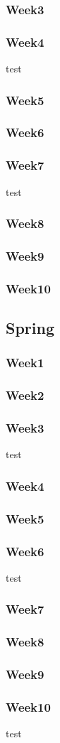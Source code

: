 \subsubsection*{Week3}
\subsubsection*{Week4}
test
\subsubsection*{Week5}
\subsubsection*{Week6}
\subsubsection*{Week7}
test
\subsubsection*{Week8}
\subsubsection*{Week9}
\subsubsection*{Week10}

\subsection*{Spring}
\subsubsection*{Week1}
\subsubsection*{Week2}
\subsubsection*{Week3}
test
\subsubsection*{Week4}
\subsubsection*{Week5}
\subsubsection*{Week6}
test
\subsubsection*{Week7}
\subsubsection*{Week8}
\subsubsection*{Week9}
\subsubsection*{Week10}
test
